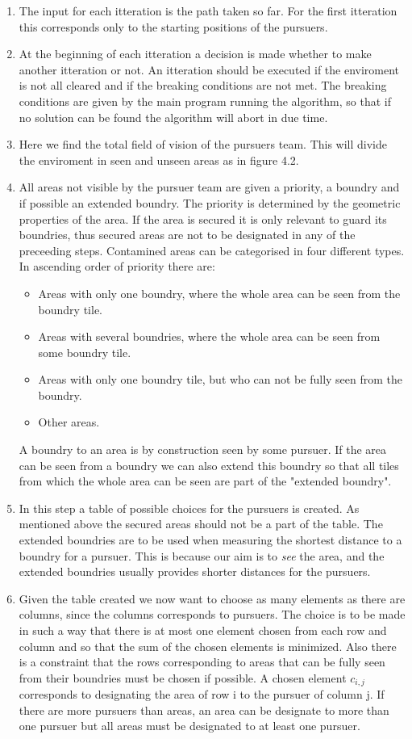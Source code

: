 \begin{enumerate}
\item{} The input for each itteration is the path taken so far. For the first itteration this corresponds only to the starting positions of the pursuers.
\item{} At the beginning of each itteration a decision is made whether to make another itteration or not. An itteration should be executed if the enviroment is not all cleared and if the breaking conditions are not met. The breaking conditions are given by the main program running the algorithm, so that if no solution can be found the algorithm will abort in due time.   
\item{} Here we find the total field of vision of the pursuers team. This will divide the enviroment in seen and unseen areas as in figure 4.2.   
\item{} All areas not visible by the pursuer team are given a priority, a boundry and if possible an extended boundry. The priority is determined by the geometric properties of the area. If the area is secured it is only relevant to guard its boundries, thus secured areas are not to be designated in any of the preceeding steps. Contamined areas can be categorised in four different types. In ascending order of priority there are:
\begin{itemize} 
\item{}Areas with only one boundry, where the whole area can be seen from the boundry tile.
\item{}Areas with several boundries, where the whole area can be seen from some boundry tile. 
\item{}Areas with only one boundry tile, but who can not be fully seen from the boundry.
\item{}Other areas.
\end{itemize}
A boundry to an area is by construction seen by some pursuer. If the area can be seen from a boundry we can also extend this boundry so that all tiles from which the whole area can be seen are part of the "extended boundry".  
\item{} In this step a table of possible choices for the pursuers is created. As mentioned above the secured areas should not be a part of the table. The extended boundries are to be used when measuring the shortest distance to a boundry for a pursuer. This is because our aim is to \emph{see} the area, and the extended boundries usually provides shorter distances for the pursuers.
\item{} Given the table created we now want to choose as many elements as there are columns, since the columns corresponds to pursuers. The choice is to be made in such a way that there is at most one element chosen from each row and column and so that the sum of the chosen elements is minimized. Also there is a constraint that the rows corresponding to areas that can be fully seen from their boundries must be chosen if possible. A chosen element $c_{i,j}$ corresponds to designating the area of row i to the pursuer of column j. If there are more pursuers than areas, an area can be designate to more than one pursuer but all areas must be designated to at least one pursuer. 

\end{enumerate}

